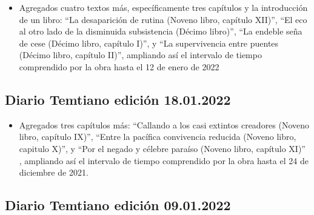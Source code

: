 \documentclass[
]{book}
\providecommand{\tightlist}{%
  \setlength{\itemsep}{0pt}\setlength{\parskip}{0pt}}
\begin{document}
\begin{itemize}
\tightlist
\item
  Agregados cuatro textos más, específicamente tres capítulos y la introducción de un libro: ``La desaparición de rutina (Noveno libro, capítulo XII)'', ``El eco al otro lado de la disminuida subsistencia (Décimo libro)'', ``La endeble seña de cese (Décimo libro, capítulo I)'', y ``La supervivencia entre puentes (Décimo libro, capítulo II)'', ampliando así el intervalo de tiempo comprendido por la obra hasta el 12 de enero de 2022
\end{itemize}

\hypertarget{diario-temtiano-ediciuxf3n-18.01.2022}{%
\subsection*{Diario Temtiano edición 18.01.2022}\label{diario-temtiano-ediciuxf3n-18.01.2022}}

\begin{itemize}
\tightlist
\item
  Agregados tres capítulos más: ``Callando a los casi extintos creadores (Noveno libro, capítulo IX)'', ``Entre la pacífica convivencia reducida (Noveno libro, capitulo X)'', y ``Por el negado y célebre paraíso (Noveno libro, capítulo XI)'' , ampliando así el intervalo de tiempo comprendido por la obra hasta el 24 de diciembre de 2021.
\end{itemize}

\hypertarget{diario-temtiano-ediciuxf3n-09.01.2022}{%
\subsection*{Diario Temtiano edición 09.01.2022}\label{diario-temtiano-ediciuxf3n-09.01.2022}}
\end{document}
